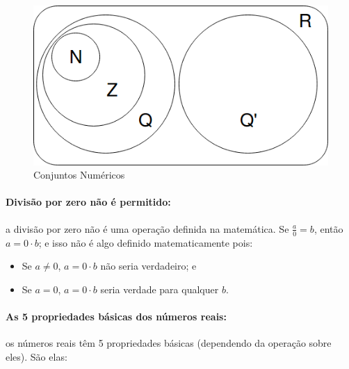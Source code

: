 \documentclass[pdftex, brazil, 12pt, twoside]{article}
\begin{document}
\begin{figure}[ht]
  \begin{center}
    \caption{Conjuntos Numéricos}
    \label{fig:conjuntos-numericos}
    \includegraphics[scale=0.6]{imagens/conjuntos_numericos.png}
  \end{center}
\end{figure}

\paragraph{Divisão por zero não é permitido:} a divisão por zero não é uma operação definida
na matemática. Se $\frac{a}{0} = b$, então $a = 0 \cdot b$; e isso não é algo definido matematicamente pois:

\begin{itemize}[noitemsep]
\item Se $a \ne 0$, $a = 0 \cdot b$ não seria verdadeiro; e
\item Se $a = 0$, $a = 0 \cdot b$ seria verdade para qualquer $b$.
\end{itemize}

\paragraph{As 5 propriedades básicas dos números reais:} os números reais têm 5 propriedades
básicas (dependendo da operação sobre eles). São elas:
\end{document}
